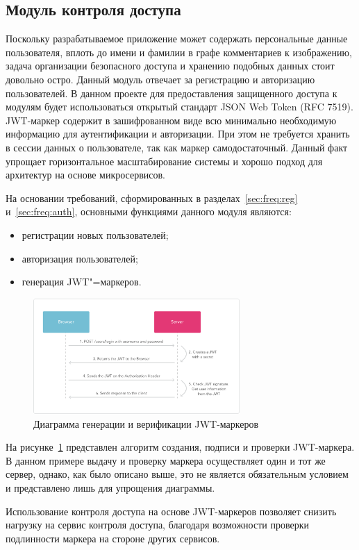 \subsection{Модуль контроля доступа}
Поскольку разрабатываемое приложение может содержать персональные данные пользователя, вплоть до имени и фамилии в графе комментариев к изображению, задача организации безопасного доступа и хранению подобных данных стоит довольно остро.
Данный модуль отвечает за регистрацию и авторизацию пользователей. 
В данном проекте для предоставления защищенного доступа к модулям будет использоваться открытый стандарт JSON Web Token (RFC 7519). JWT-маркер  содержит в зашифрованном виде всю минимально необходимую информацию для аутентификации и авторизации. При этом не требуется хранить в сессии данных о пользователе, так как маркер самодостаточный. Данный факт упрощает горизонтальное масштабирование системы и хорошо подход для архитектур на основе микросервисов.

На основании требований, сформированных в разделах~\ref{sec:freq:reg} и~\ref{sec:freq:auth}, основными функциями данного модуля являются:
\begin{itemize}
  \item регистрации новых пользователей;
  \item авторизация пользователей;
  \item генерация JWT"=маркеров.
\end{itemize}

\begin{figure}[ht]
    \centering
    \includegraphics[width=0.7\textwidth]{figures/jwt_diagram.png}
    \caption{Диаграмма генерации и верификации JWT-маркеров}
    \label{fig:architecture:jwt_diagram}
\end{figure}

На рисунке~\ref{fig:architecture:jwt_diagram} представлен алгоритм создания, подписи и проверки JWT-маркера. В данном примере выдачу и проверку маркера осуществляет один и тот же сервер, однако, как было описано выше, это не является обязательным условием и представлено лишь для упрощения диаграммы.

Использование контроля доступа на основе JWT-маркеров позволяет снизить нагрузку на сервис контроля доступа, благодаря возможности проверки подлинности маркера на стороне других сервисов.

